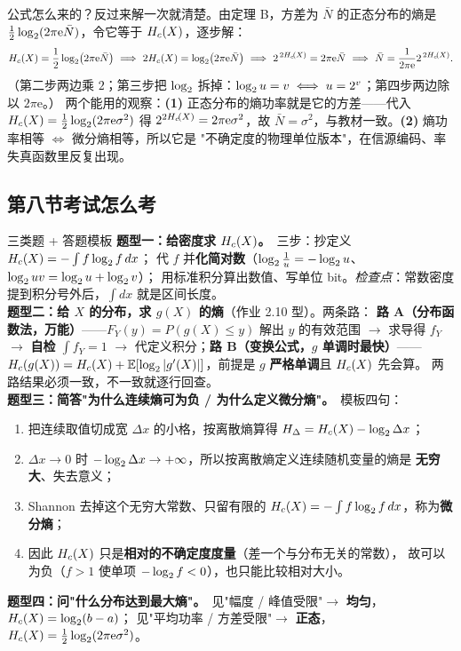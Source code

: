 公式怎么来的？反过来解一次就清楚。由定理 B，方差为 $\bar N$ 的正态分布的熵是
$\frac12\log_{2}(2\pi\mathrm{e}\bar N)$，令它等于 $H_{c}\!\left(X\right)$，逐步解：
\[
H_{c}\!\left(X\right)=\frac12\log_{2}\bigl(2\pi\mathrm{e}\bar N\bigr)
\ \Longrightarrow\
2H_{c}\!\left(X\right)=\log_{2}\bigl(2\pi\mathrm{e}\bar N\bigr)
\ \Longrightarrow\
2^{\,2H_{c}\!\left(X\right)}=2\pi\mathrm{e}\bar N
\ \Longrightarrow\
\bar N=\frac{1}{2\pi\mathrm{e}}2^{\,2H_{c}\!\left(X\right)} .
\]
（第二步两边乘 $2$；第三步把 $\log_{2}$ 拆掉：$\log_{2} u=v\iff u=2^v$；第四步两边除以 $2\pi\mathrm{e}$。）
两个能用的观察：\textbf{(1)} 正态分布的熵功率就是它的方差——代入
$H_{c}\!\left(X\right)=\frac12\log_{2}(2\pi\mathrm{e}\sigma^2)$ 得 $2^{2H_{c}\!\left(X\right)}=2\pi\mathrm{e}\sigma^2$，故
$\bar N=\sigma^2$，与教材一致。\textbf{(2)} 熵功率相等 $\iff$ 微分熵相等，所以它是
"不确定度的物理单位版本"，在信源编码、率失真函数里反复出现。

\subsection{第八节\quad 考试怎么考}

\begin{exam}{三类题 + 答题模板}
\textbf{题型一：给密度求 $H_{c}\!\left(X\right)$。}\ 三步：抄定义 $H_{c}\!\left(X\right)=-\int f\log_{2} f\,dx$；
代 $f$ 并\textbf{化简对数}（$\log_{2}\frac1u=-\log_{2} u$、$\log_{2} uv=\log_{2} u+\log_{2} v$）；
用标准积分算出数值、写单位 bit。\emph{检查点}：常数密度提到积分号外后，$\int dx$ 就是区间长度。\\[3pt]
\textbf{题型二：给 $X$ 的分布，求 $g(X)$ 的熵}（作业 2.10 型）。两条路：
\textbf{路 A（分布函数法，万能）}——$F_Y(y)=P(g(X)\le y)$ 解出 $y$ 的有效范围 $\to$ 求导得 $f_Y$
$\to$ \textbf{自检 $\int f_Y=1$} $\to$ 代定义积分；\textbf{路 B（变换公式，$g$ 单调时最快）}——
$H_{c}\!\left(g(X)\right)=H_{c}\!\left(X\right)+\operatorname{\mathbb{E}}[\log_{2}|g'(X)|]$，前提是 $g$ \textbf{严格单调}且 $H_{c}\!\left(X\right)$ 先会算。
两路结果必须一致，不一致就逐行回查。\\[3pt]
\textbf{题型三：简答"为什么连续熵可为负 / 为什么定义微分熵"。}\ 模板四句：
\begin{enumerate}[leftmargin=1.6em,itemsep=1pt,topsep=1pt]
\item 把连续取值切成宽 $\Delta x$ 的小格，按离散熵算得 $H_\Delta=H_{c}\!\left(X\right)-\log_{2}\Delta x$；
\item $\Delta x\to0$ 时 $-\log_{2}\Delta x\to+\infty$，所以按离散熵定义连续随机变量的熵是
\textbf{无穷大}、失去意义；
\item Shannon 去掉这个无穷大常数、只留有限的 $H_{c}\!\left(X\right)=-\int f\log_{2} f\,dx$，称为\textbf{微分熵}；
\item 因此 $H_{c}\!\left(X\right)$ 只是\textbf{相对的不确定度度量}（差一个与分布无关的常数），
故可以为负（$f>1$ 使单项 $-\log_{2} f<0$），也只能比较相对大小。
\end{enumerate}
\textbf{题型四：问"什么分布达到最大熵"。}\ 见"幅度 / 峰值受限"$\to$ \textbf{均匀}，$H_{c}\!\left(X\right)=\log_{2}(b-a)$；
见"平均功率 / 方差受限"$\to$ \textbf{正态}，$H_{c}\!\left(X\right)=\frac12\log_{2}(2\pi\mathrm{e}\sigma^2)$。
\end{exam}

